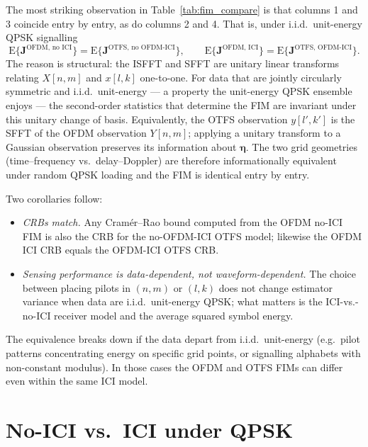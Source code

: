 \documentclass[11pt]{article}
\begin{document}
The most striking observation in Table~\ref{tab:fim_compare} is that
columns 1 and 3 coincide entry by entry, as do columns 2 and 4. That
is, under i.i.d.\ unit-energy QPSK signalling
\begin{equation}
    \boxed{\;
    \mathrm{E}\{\bm{J}^{\text{OFDM, no ICI}}\} =
    \mathrm{E}\{\bm{J}^{\text{OTFS, no OFDM-ICI}}\},
    \qquad
    \mathrm{E}\{\bm{J}^{\text{OFDM, ICI}}\} =
    \mathrm{E}\{\bm{J}^{\text{OTFS, OFDM-ICI}}\}.
    \;}
\end{equation}
The reason is structural: the ISFFT and SFFT are unitary linear
transforms relating \(X[n,m]\) and \(x[l,k]\) one-to-one. For data
that are jointly circularly symmetric and i.i.d.\ unit-energy --- a
property the unit-energy QPSK ensemble enjoys --- the second-order
statistics that determine the FIM are invariant under this unitary
change of basis. Equivalently, the OTFS observation
\(y[l',k']\) is the SFFT of the OFDM observation \(Y[n,m]\); applying
a unitary transform to a Gaussian observation preserves its
information about \(\bm{\eta}\). The two grid geometries (time--frequency
vs.\ delay--Doppler) are therefore informationally equivalent under
random QPSK loading and the FIM is identical entry by entry.

Two corollaries follow:
\begin{itemize}
    \item \emph{CRBs match.} Any Cram\'er--Rao bound computed from the
          OFDM no-ICI FIM is also the CRB for the no-OFDM-ICI OTFS
          model; likewise the OFDM ICI CRB equals the OFDM-ICI OTFS
          CRB.
    \item \emph{Sensing performance is data-dependent, not
          waveform-dependent.} The choice between placing pilots in
          \((n,m)\) or \((l,k)\) does not change estimator variance
          when data are i.i.d.\ unit-energy QPSK; what matters is the
          ICI-vs.-no-ICI receiver model and the average squared
          symbol energy.
\end{itemize}
The equivalence breaks down if the data depart from i.i.d.\
unit-energy (e.g.\ pilot patterns concentrating energy on specific
grid points, or signalling alphabets with non-constant modulus). In
those cases the OFDM and OTFS FIMs can differ even within the same
ICI model.

\section{No-ICI vs.\ ICI under QPSK}
\end{document}
